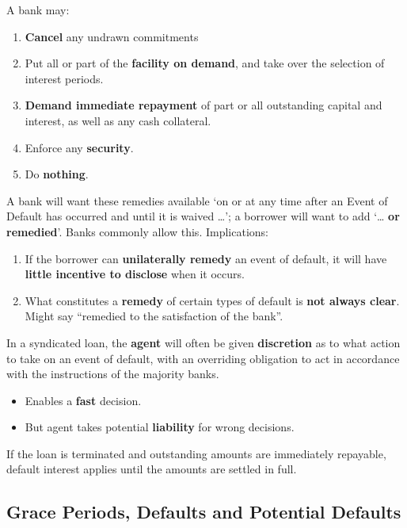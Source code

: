 \documentclass[
]{article}
\providecommand{\tightlist}{%
  \setlength{\itemsep}{0pt}\setlength{\parskip}{0pt}}
\begin{document}
A bank may:

\begin{enumerate}
\tightlist
\item
  \textbf{Cancel} any undrawn commitments
\item
  Put all or part of the \textbf{facility on demand}, and take over the
  selection of interest periods.
\item
  \textbf{Demand immediate repayment} of part or all outstanding capital
  and interest, as well as any cash collateral.
\item
  Enforce any \textbf{security}.
\item
  Do \textbf{nothing}.
\end{enumerate}

A bank will want these remedies available `on or at any time after an
Event of Default has occurred and until it is waived \ldots'; a borrower
will want to add `\ldots{} \textbf{or remedied}'. Banks commonly allow
this. Implications:

\begin{enumerate}
\tightlist
\item
  If the borrower can \textbf{unilaterally remedy} an event of default,
  it will have \textbf{little incentive to disclose} when it occurs.
\item
  What constitutes a \textbf{remedy} of certain types of default is
  \textbf{not always clear}. Might say ``remedied to the satisfaction of
  the bank''.
\end{enumerate}

In a syndicated loan, the \textbf{agent} will often be given
\textbf{discretion} as to what action to take on an event of default,
with an overriding obligation to act in accordance with the instructions
of the majority banks.

\begin{itemize}
\tightlist
\item
  Enables a \textbf{fast} decision.
\item
  But agent takes potential \textbf{liability} for wrong decisions.
\end{itemize}

If the loan is terminated and outstanding amounts are immediately
repayable, default interest applies until the amounts are settled in
full.

\hypertarget{grace-periods-defaults-and-potential-defaults}{%
\subsection{Grace Periods, Defaults and Potential
Defaults}\label{grace-periods-defaults-and-potential-defaults}}
\end{document}
